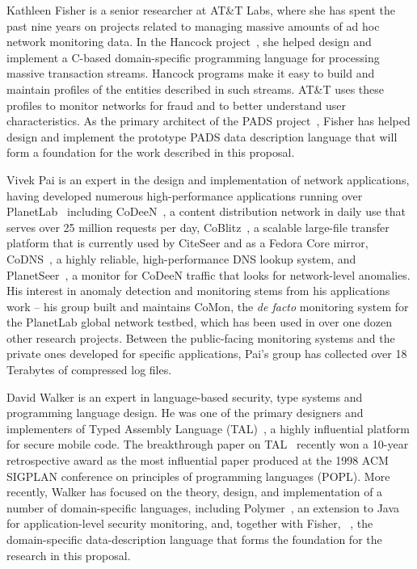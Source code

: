 \documentclass[12pt]{article}
\begin{document}
Kathleen Fisher is a senior researcher at AT\&T Labs,
where she has spent the past nine years on projects
related to managing massive amounts of ad hoc network monitoring data.
In the Hancock project~\cite{kdd00,hancock-toplas}, she helped 
design and implement a C-based
domain-specific programming language for processing massive  
transaction streams.  Hancock programs make it easy to build
and maintain profiles of the entities described in such streams. 
AT\&T uses these profiles to monitor networks for fraud 
and to better understand user characteristics.
As the primary architect of the PADS project~\cite{fisher+:pads,fisher+:popl06,daly+:pads-demo,mandelbaum+:pads-ml}, 
Fisher has helped design and implement the prototype PADS
data description language that will form a foundation for the work
described in this proposal.  

Vivek Pai is an expert in the design and implementation of network
applications, having developed numerous high-performance applications
running over PlanetLab~\cite{planetlab} including
CoDeeN~\cite{codeen}, a content distribution network in daily use that
serves over 25 million requests per day, CoBlitz~\cite{coblitz}, a
scalable large-file transfer platform that is currently used by
CiteSeer and as a Fedora Core mirror, CoDNS~\cite{codns}, a highly
reliable, high-performance DNS lookup system, and
PlanetSeer~\cite{planetseer}, a monitor for CoDeeN traffic that looks
for network-level anomalies.  His interest in anomaly detection and
monitoring stems from his applications work -- his group built and
maintains CoMon, the {\it de facto} monitoring system for the
PlanetLab global network testbed, which has been used in over one
dozen other research projects. Between the public-facing monitoring
systems and the private ones developed for specific applications, Pai's
group has collected over 18 Terabytes of compressed log files.

David Walker is an expert in language-based security,
type systems and programming language design.
He was one of the primary designers 
and implementers
of Typed Assembly Language (TAL)~\cite{morrisett+:tal-popl,morrisett+:tal,morrisett+:journal-stal}, 
a highly influential platform
for secure mobile code.  The breakthrough paper on 
TAL~\cite{morrisett+:tal-popl} recently won a 10-year retrospective
award as the most influential paper produced at the 1998 ACM SIGPLAN conference
on principles of programming languages (POPL).  More recently, Walker
has focused on the theory, design, and implementation of a number of
domain-specific languages, including
Polymer~\cite{bauer+:polymer,ligatti+:renewal,ligatti+:edit-automata}, an
extension to Java for application-level security monitoring, and,
together with Fisher, \pads{}~\cite{fisher+:pads,fisher+:popl06,daly+:pads-demo,mandelbaum+:pads-ml}, the domain-specific data-description language that forms 
the foundation for the research in this proposal.
\end{document}

